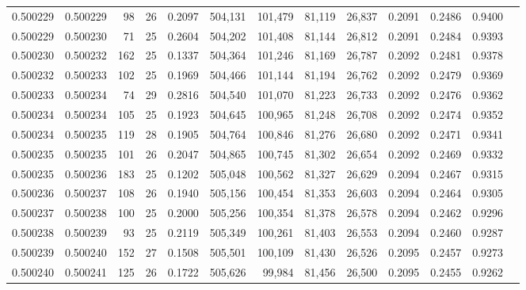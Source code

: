 \begin{tabular}{rrrrrrrrrrrrr}
0.500229 & 0.500229 &  98 &  26 &                                     0.2097 & 504,131 & 101,479 &  81,119 &  26,837 & 0.2091 & 0.2486 & 0.9400 \\
0.500229 & 0.500230 &  71 &  25 &                                     0.2604 & 504,202 & 101,408 &  81,144 &  26,812 & 0.2091 & 0.2484 & 0.9393 \\
0.500230 & 0.500232 & 162 &  25 &                                     0.1337 & 504,364 & 101,246 &  81,169 &  26,787 & 0.2092 & 0.2481 & 0.9378 \\
0.500232 & 0.500233 & 102 &  25 &                                     0.1969 & 504,466 & 101,144 &  81,194 &  26,762 & 0.2092 & 0.2479 & 0.9369 \\
0.500233 & 0.500234 &  74 &  29 &                                     0.2816 & 504,540 & 101,070 &  81,223 &  26,733 & 0.2092 & 0.2476 & 0.9362 \\
0.500234 & 0.500234 & 105 &  25 &                                     0.1923 & 504,645 & 100,965 &  81,248 &  26,708 & 0.2092 & 0.2474 & 0.9352 \\
0.500234 & 0.500235 & 119 &  28 &                                     0.1905 & 504,764 & 100,846 &  81,276 &  26,680 & 0.2092 & 0.2471 & 0.9341 \\
0.500235 & 0.500235 & 101 &  26 &                                     0.2047 & 504,865 & 100,745 &  81,302 &  26,654 & 0.2092 & 0.2469 & 0.9332 \\
0.500235 & 0.500236 & 183 &  25 &                                     0.1202 & 505,048 & 100,562 &  81,327 &  26,629 & 0.2094 & 0.2467 & 0.9315 \\
0.500236 & 0.500237 & 108 &  26 &                                     0.1940 & 505,156 & 100,454 &  81,353 &  26,603 & 0.2094 & 0.2464 & 0.9305 \\
0.500237 & 0.500238 & 100 &  25 &                                     0.2000 & 505,256 & 100,354 &  81,378 &  26,578 & 0.2094 & 0.2462 & 0.9296 \\
0.500238 & 0.500239 &  93 &  25 &                                     0.2119 & 505,349 & 100,261 &  81,403 &  26,553 & 0.2094 & 0.2460 & 0.9287 \\
0.500239 & 0.500240 & 152 &  27 &                                     0.1508 & 505,501 & 100,109 &  81,430 &  26,526 & 0.2095 & 0.2457 & 0.9273 \\
0.500240 & 0.500241 & 125 &  26 &                                     0.1722 & 505,626 &  99,984 &  81,456 &  26,500 & 0.2095 & 0.2455 & 0.9262 \\

\end{tabular}
